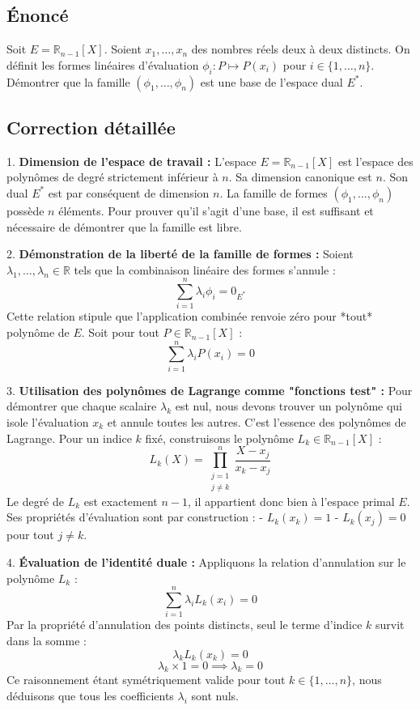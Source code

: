 \documentclass[11pt,a4paper]{report}
\begin{document}
\subsection{Énoncé}
Soit $E = \mathbb{R}_{n-1}[X]$. Soient $x_1, \dots, x_n$ des nombres réels deux à deux distincts. On définit les formes linéaires d'évaluation $\phi_i : P \mapsto P(x_i)$ pour $i \in \{1, \dots, n\}$. Démontrer que la famille $(\phi_1, \dots, \phi_n)$ est une base de l'espace dual $E^*$.

\subsection{Correction détaillée}

1. \textbf{Dimension de l'espace de travail :}
   L'espace $E = \mathbb{R}_{n-1}[X]$ est l'espace des polynômes de degré strictement inférieur à $n$. Sa dimension canonique est $n$.
   Son dual $E^*$ est par conséquent de dimension $n$.
   La famille de formes $(\phi_1, \dots, \phi_n)$ possède $n$ éléments. Pour prouver qu'il s'agit d'une base, il est suffisant et nécessaire de démontrer que la famille est libre.

2. \textbf{Démonstration de la liberté de la famille de formes :}
   Soient $\lambda_1, \dots, \lambda_n \in \mathbb{R}$ tels que la combinaison linéaire des formes s'annule :
   $$\sum_{i=1}^n \lambda_i \phi_i = 0_{E^*}$$
   Cette relation stipule que l'application combinée renvoie zéro pour *tout* polynôme de $E$. Soit pour tout $P \in \mathbb{R}_{n-1}[X]$ :
   $$\sum_{i=1}^n \lambda_i P(x_i) = 0$$

3. \textbf{Utilisation des polynômes de Lagrange comme "fonctions test" :}
   Pour démontrer que chaque scalaire $\lambda_k$ est nul, nous devons trouver un polynôme qui isole l'évaluation $x_k$ et annule toutes les autres. C'est l'essence des polynômes de Lagrange.
   Pour un indice $k$ fixé, construisons le polynôme $L_k \in \mathbb{R}_{n-1}[X]$ :
   $$L_k(X) = \prod_{\substack{j=1 \\ j \neq k}}^n \frac{X - x_j}{x_k - x_j}$$
   Le degré de $L_k$ est exactement $n-1$, il appartient donc bien à l'espace primal $E$.
   Ses propriétés d'évaluation sont par construction :
   - $L_k(x_k) = 1$
   - $L_k(x_j) = 0$ pour tout $j \neq k$.

4. \textbf{Évaluation de l'identité duale :}
   Appliquons la relation d'annulation sur le polynôme $L_k$ :
   $$\sum_{i=1}^n \lambda_i L_k(x_i) = 0$$
   Par la propriété d'annulation des points distincts, seul le terme d'indice $k$ survit dans la somme :
   $$\lambda_k L_k(x_k) = 0$$
   $$\lambda_k \times 1 = 0 \implies \lambda_k = 0$$
   Ce raisonnement étant symétriquement valide pour tout $k \in \{1, \dots, n\}$, nous déduisons que tous les coefficients $\lambda_i$ sont nuls.
\end{document}
